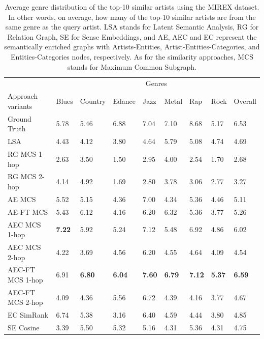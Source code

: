 \begin{table}[]
\scriptsize
\centering
	\begin{tabular}{ lllllllll }
 	\toprule
& \multicolumn{8}{c}{Genres} \\
\cmidrule(lr){2-9}
	Approach variants & Blues & Country & Edance & Jazz & Metal & Rap & Rock & Overall\\
	\midrule
Ground Truth & 5.78 & 5.46 & 6.88 & 7.04 & 7.10 & 8.68 & 5.17 & 6.53\\
\midrule[.2pt]
LSA & 4.43 & 4.12 & 3.80 & 4.64 & 5.79 & 5.08 & 4.74 & 4.69\\
RG MCS 1-hop & 2.63 & 3.50 & 1.50 & 2.95 & 4.00 & 2.54 & 1.70 &  2.68\\
RG MCS 2-hop & 4.14 & 4.92 & 1.69 & 2.80 & 3.78 & 3.06 & 2.77 & 3.27\\
AE MCS & 5.52 & 5.15 & 4.36 & 7.00 & 4.34 & 5.36 & 4.46 & 5.11\\
AE-FT MCS & 5.43 & 6.12 & 4.16 & 6.20 & 6.32 & 5.36 & 3.77 & 5.26 \\
AEC MCS 1-hop & \textbf{7.22} & 5.92 & 5.24 & 7.12 & 5.48 & 6.92 & 4.86 & 6.02 \\
AEC MCS 2-hop & 4.22 & 3.69 & 4.56 & 6.20 & 4.55 & 4.64 & 4.09 & 4.54 \\
AEC-FT MCS 1-hop & 6.91 & \textbf{6.80} & \textbf{6.04} & \textbf{7.60} & \textbf{6.79} & \textbf{7.12} & \textbf{5.37} & \textbf{6.59} \\
AEC-FT MCS 2-hop & 4.09 & 4.36 & 5.56 & 6.72 & 4.39 & 4.16 & 3.77 & 4.67 \\
EC SimRank & 6.74 & 5.38 & 3.16 & 6.40 & 4.59 & 4.44 & 3.80 & 4.85 \\
SE Cosine & 3.39 & 5.50 & 5.32 & 5.16 & 4.31 & 5.36 & 4.31 & 4.75 \\
\bottomrule	
	\end{tabular}
	\caption[Average genre distribution of the top-10 similar artists using the MIREX dataset.]{Average genre distribution of the top-10 similar artists using the MIREX dataset. In other words, on average, how many of the top-10 similar artists are from the same genre as the query artist. LSA stands for Latent Semantic Analysis, RG for Relation Graph, SE for Sense Embeddings,  and AE, AEC and EC represent the semantically enriched graphs with Artists-Entities, Artist-Entities-Categories, and Entities-Categories nodes, respectively. As for the similarity approaches, MCS stands for Maximum Common Subgraph.}	
	\label{tbl:similarity:res_genre_distrib}
\end{table}


